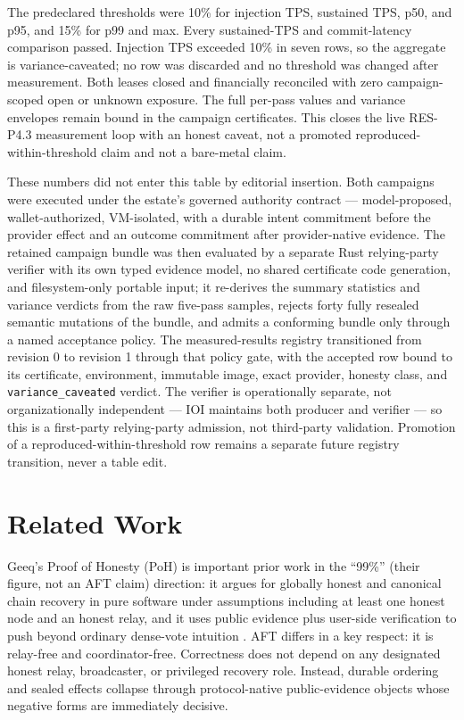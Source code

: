 \documentclass[11pt]{article}
\newcommand{\AFT}{\textsc{AFT}}
\newcommand{\code}[1]{\texttt{#1}}
\begin{document}
The predeclared thresholds were 10\% for injection TPS, sustained TPS, p50,
and p95, and 15\% for p99 and max. Every sustained-TPS and commit-latency
comparison passed. Injection TPS exceeded 10\% in seven rows, so the aggregate
is variance-caveated; no row was discarded and no threshold was changed after
measurement. Both leases closed and financially reconciled with zero
campaign-scoped open or unknown exposure. The full per-pass values and variance
envelopes remain bound in the campaign certificates. This closes the live
RES-P4.3 measurement loop with an honest caveat, not a promoted
reproduced-within-threshold claim and not a bare-metal claim.

These numbers did not enter this table by editorial insertion. Both campaigns
were executed under the estate's governed authority contract ---
model-proposed, wallet-authorized, VM-isolated, with a durable intent
commitment before the provider effect and an outcome commitment after
provider-native evidence. The retained campaign bundle was then evaluated by a
separate Rust relying-party verifier with its own typed evidence model, no
shared certificate code generation, and filesystem-only portable input; it
re-derives the summary statistics and variance verdicts from the raw five-pass
samples, rejects forty fully resealed semantic mutations of the bundle, and
admits a conforming bundle only through a named acceptance policy. The
measured-results registry transitioned from revision 0 to revision 1 through
that policy gate, with the accepted row bound to its certificate, environment,
immutable image, exact provider, honesty class, and \code{variance\_caveated}
verdict. The verifier is operationally separate, not organizationally
independent --- IOI maintains both producer and verifier --- so this is a
first-party relying-party admission, not third-party validation. Promotion of
a reproduced-within-threshold row remains a separate future registry
transition, never a table edit.

\section{Related Work}

Geeq's Proof of Honesty (PoH) is important prior work in the ``99\%'' (their figure, not an \AFT{} claim) direction:
it argues for globally honest and canonical chain recovery in pure software
under assumptions including at least one honest node and an honest relay, and
it uses public evidence plus user-side verification to push beyond ordinary
dense-vote intuition \cite{geeq}. \AFT{} differs in a key respect: it is
relay-free and coordinator-free. Correctness does not depend on any designated
honest relay, broadcaster, or privileged recovery role. Instead, durable
ordering and sealed effects collapse through protocol-native public-evidence
objects whose negative forms are immediately decisive.
\end{document}
